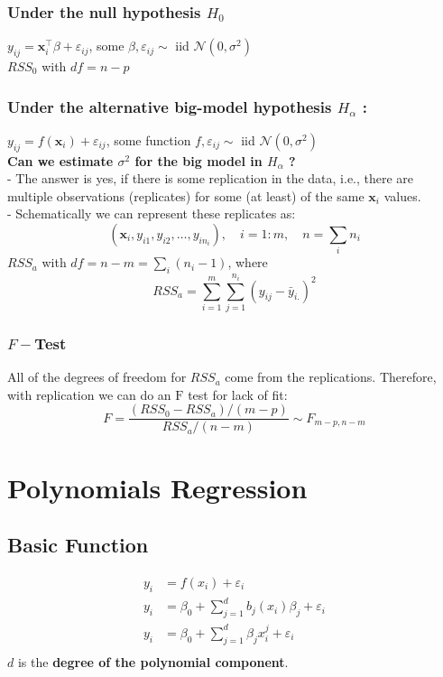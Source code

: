 \documentclass[11pt,a4paper]{article}
\begin{document}
\subsubsection{Under the null hypothesis $H_{0}$}
$y_{i j}=\mathbf{x}_{i}^{\top} \beta+\varepsilon_{i j}$, some $\beta, \varepsilon_{i j} \sim$ iid $\mathcal{N}\left(0, \sigma^{2}\right)$\\
$R S S_{0}$ with $d f=n-p$
\subsubsection{Under the alternative big-model hypothesis $H_{\alpha}$ :}
$y_{i j}=f\left(\mathbf{x}_{i}\right)+\varepsilon_{i j}$, some function $f, \varepsilon_{i j} \sim$ iid $\mathcal{N}\left(0, \sigma^{2}\right)$\\
\textbf{Can we estimate $\sigma^{2}$ for the big model in $H_{\alpha}$ ?}\\
- The answer is yes, if there is some replication in the data, i.e., there are multiple observations (replicates) for some (at least) of the same $\mathbf{x}_{i}$ values.\\
- Schematically we can represent these replicates as:
$$
\left(\mathbf{x}_{i}, y_{i 1}, y_{i 2}, \ldots, y_{i n_{i}}\right), \quad i=1: m, \quad n=\sum_{i} n_{i}
$$
$R S S_{a}$ with $d f=n-m=\sum_{i}\left(n_{i}-1\right)$, where
$$
R S S_{a}=\sum_{i=1}^{m} \sum_{j=1}^{n_{i}}\left(y_{i j}-\bar{y}_{i .}\right)^{2}
$$
\subsubsection{$F-$Test}
All of the degrees of freedom for $R S S_{a}$ come from the replications. Therefore, with replication we can do an $\mathrm{F}$ test for lack of fit:
$$
F=\frac{\left(R S S_{0}-R S S_{a}\right) /(m-p)}{R S S_{a} /(n-m)} \sim F_{m-p, n-m}
$$

\section{Polynomials Regression}
\subsection{Basic Function}
\begin{equation}
    \begin{aligned}
        y_i&=f(x_i)+\varepsilon_i\\
        y_i&=\beta_0+\sum_{j=1}^db_j(x_i)\beta_j+\varepsilon_i\\
        y_i&=\beta_0+\sum_{j=1}^d\beta_j
        x_i^j+\varepsilon_i\\
    \end{aligned}
    \nonumber
\end{equation}
$d$ is the \textbf{degree of the polynomial component}.\\
\end{document}
